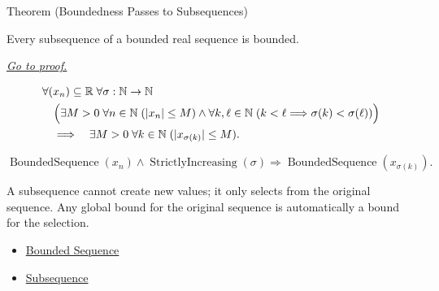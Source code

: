 \begin{theorembox}{Theorem (Boundedness Passes to Subsequences)}
\begin{theorem}
\label{thm:boundedness-passes-to-subsequences}
Every subsequence of a bounded real sequence is bounded.

\smallskip
\noindent
\hyperref[prf:boundedness-passes-to-subsequences]{\textit{Go to proof.}}
\end{theorem}
\end{theorembox}

\begin{remark*}
\[
\begin{aligned}
&\forall (x_n)\subseteq\mathbb{R}\;\forall \sigma:\mathbb{N}\to\mathbb{N}\\
&\quad\Bigl(
  \exists M>0\;\forall n\in\mathbb{N}\;(|x_n|\le M)
  \land
  \forall k,\ell\in\mathbb{N}\;(k<\ell\Longrightarrow\sigma(k)<\sigma(\ell))
\Bigr)\\
&\quad\Longrightarrow\quad
\exists M>0\;\forall k\in\mathbb{N}\;(|x_{\sigma(k)}|\le M).
\end{aligned}
\]
\end{remark*}

\begin{remark*}
\[
\operatorname{BoundedSequence}(x_n)
\land
\operatorname{StrictlyIncreasing}(\sigma)
\Longrightarrow
\operatorname{BoundedSequence}(x_{\sigma(k)}).
\]
\end{remark*}

\begin{remark*}[Interpretation]
A subsequence cannot create new values; it only selects from the original
sequence. Any global bound for the original sequence is automatically a bound
for the selection.
\end{remark*}

\begin{dependencies}
\begin{itemize}
  \item \hyperref[def:bounded-sequence]{Bounded Sequence}
  \item \hyperref[def:subsequence]{Subsequence}
\end{itemize}
\end{dependencies}


